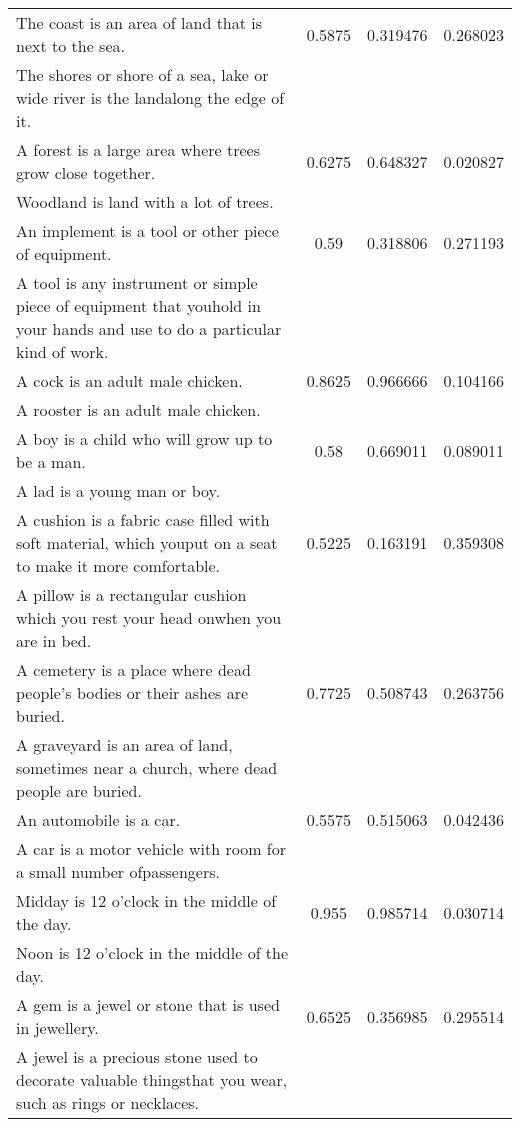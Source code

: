 \begin{center}
{\begin{longtable}{|p{9cm}|c|c|c|}
\hline
The coast is an area of land that is next to the sea. & 0.5875 & 0.319476 & 0.268023 \\
The shores or shore of a sea, lake or wide river is the landalong the edge of it. & & & \\
\hline
A forest is a large area where trees grow close together. & 0.6275 & 0.648327 & 0.020827 \\
Woodland is land with a lot of trees. & & & \\
\hline
An implement is a tool or other piece of equipment. & 0.59 & 0.318806 & 0.271193 \\
A tool is any instrument or simple piece of equipment that youhold in your hands and use to do a particular kind of work. & & & \\
\hline
A cock is an adult male chicken. & 0.8625 & 0.966666 & 0.104166 \\
A rooster is an adult male chicken. & & & \\
\hline
A boy is a child who will grow up to be a man. & 0.58 & 0.669011 & 0.089011 \\
A lad is a young man or boy. & & & \\
\hline
A cushion is a fabric case filled with soft material, which youput on a seat to make it more comfortable. & 0.5225 & 0.163191 & 0.359308 \\
A pillow is a rectangular cushion which you rest your head onwhen you are in bed. & & & \\
\hline
A cemetery is a place where dead people's bodies or their ashes are buried. & 0.7725 & 0.508743 & 0.263756 \\
A graveyard is an area of land, sometimes near a church, where dead people are buried. & & & \\
\hline
An automobile is a car. & 0.5575 & 0.515063 & 0.042436 \\
A car is a motor vehicle with room for a small number ofpassengers. & & & \\
\hline
Midday is 12 o'clock in the middle of the day. & 0.955 & 0.985714 & 0.030714 \\
Noon is 12 o'clock in the middle of the day. & & & \\
\hline
A gem is a jewel or stone that is used in jewellery. & 0.6525 & 0.356985 & 0.295514 \\
A jewel is a precious stone used to decorate valuable thingsthat you wear, such as rings or necklaces. & & & \\
\hline
\end{longtable}
}
\end{center}

